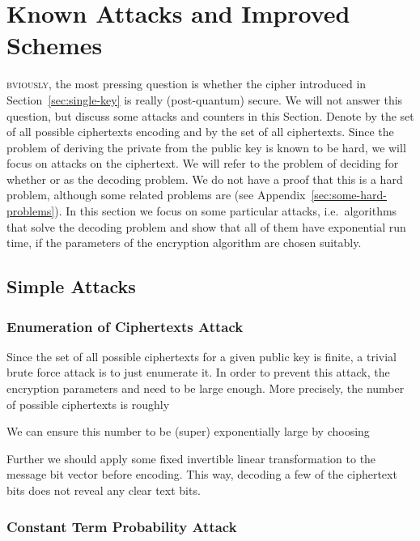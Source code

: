 \documentclass[final,journal,compsoc]{IEEEtran}
\begin{document}
\section{Known Attacks and Improved Schemes\label{sec:known-attacks-impr}}

\textsc{bviously}, the most pressing question is whether
the cipher introduced in Section~\ref{sec:single-key} is really
(post-quantum) secure. We will not answer this question, but discuss
some attacks and counters in this Section.
Denote by  the set of all possible ciphertexts encoding
 and by  the set of all ciphertexts.
Since the problem of deriving the private from the public key is known
to be hard, we will focus on attacks on the ciphertext. We will refer to
the problem of deciding for  whether  or  as the decoding problem. We do not have a proof that this is a
hard problem, although some
related problems are (see Appendix~\ref{sec:some-hard-problems}). In
this section we focus on some particular attacks, i.e.\ algorithms
that solve the decoding problem and show that all of them have
exponential run time, if the parameters of the encryption algorithm
are chosen suitably.


\subsection{Simple Attacks\label{sec:simple-attacks}}

\subsubsection{Enumeration of Ciphertexts
  Attack\label{sec:enumeration-ciphers}}

Since the set of all possible ciphertexts for a given public key is finite, a trivial
brute force attack is to just enumerate it. 
In order to prevent this attack, the encryption parameters  and
 need to be large enough. More precisely, the number of
possible ciphertexts is roughly

We
can ensure this number to be (super) exponentially large by
choosing

Further we should apply some fixed invertible linear transformation to
the message bit vector before encoding. This way, decoding a few of
the ciphertext bits does not reveal any clear text bits.  




\subsubsection{Constant Term Probability
  Attack\label{sec:const-term-prob}}
\end{document}
